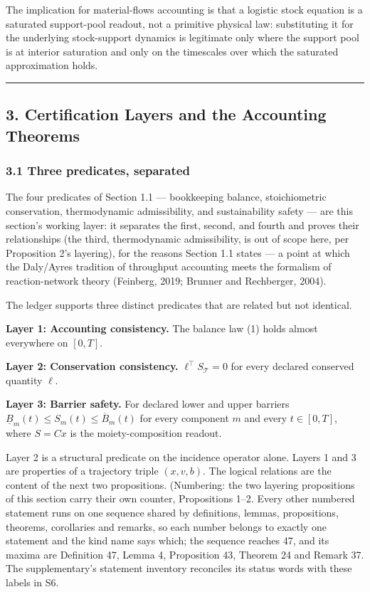\documentclass[11pt]{article}
\begin{document}
The implication for material-flows accounting is that a logistic stock
equation is a saturated support-pool readout, not a primitive physical
law: substituting it for the underlying stock-support dynamics is
legitimate only where the support pool is at interior saturation and
only on the timescales over which the saturated approximation holds.

\begin{center}\rule{0.5\linewidth}{0.5pt}\end{center}

\subsection{3. Certification Layers and the Accounting
Theorems}\label{certification-layers-and-the-accounting-theorems}

\subsubsection{3.1 Three predicates,
separated}\label{three-predicates-separated}

The four predicates of Section 1.1 --- bookkeeping balance,
stoichiometric conservation, thermodynamic admissibility, and
sustainability safety --- are this section's working layer: it separates
the first, second, and fourth and proves their relationships (the third,
thermodynamic admissibility, is out of scope here, per Proposition 2's
layering), for the reasons Section 1.1 states --- a point at which the
Daly/\allowbreak{}Ayres tradition of throughput accounting meets the formalism of
reaction-network theory (Feinberg, 2019; Brunner and Rechberger, 2004).

The ledger supports three distinct predicates that are related but not
identical.

\textbf{Layer 1: Accounting consistency.} The balance law (1) holds
almost everywhere on \([0,T]\).

\textbf{Layer 2: Conservation consistency.}
\(\ell^\top S_{\mathcal{T}} = 0\) for every declared conserved quantity
\(\ell\).

\textbf{Layer 3: Barrier safety.} For declared lower and upper barriers
\(\underline{B}_m(t) \le S_m(t) \le \overline{B}_m(t)\) for every
component \(m\) and every \(t \in [0,T]\), where \(S = Cx\) is the
moiety-composition readout.

Layer 2 is a structural predicate on the incidence operator alone.
Layers 1 and 3 are properties of a trajectory triple \((x, v, b)\). The
logical relations are the content of the next two propositions.
(Numbering: the two layering propositions of this section carry their own counter, Propositions 1--2. Every other numbered statement runs on one sequence shared by definitions, lemmas, propositions, theorems, corollaries and remarks, so each number belongs to exactly one statement and the kind name says which; the sequence reaches 47, and its maxima are Definition 47, Lemma 4, Proposition 43, Theorem 24 and Remark 37. The supplementary's statement inventory reconciles its status words with these labels in S6.
\end{document}

